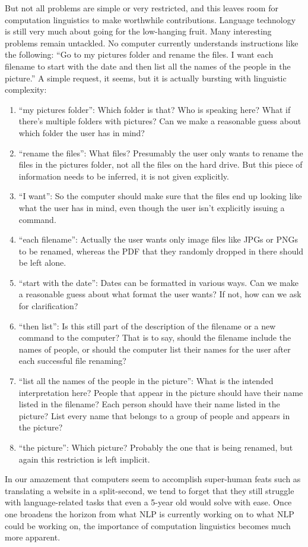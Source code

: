 But not all problems are simple or very restricted, and this leaves room for computation linguistics to make worthwhile contributions.
Language technology is still very much about going for the low-hanging fruit.
Many interesting problems remain untackled.
No computer currently understands instructions like the following: ``Go to my pictures folder and rename the files. I want each filename to start with the date and then list all the names of the people in the picture.''
A simple request, it seems, but it is actually bursting with linguistic complexity:
%
\begin{enumerate}
    \item ``my pictures folder'':
            Which folder is that?
            Who is speaking here?
            What if there's multiple folders with pictures?
            Can we make a reasonable guess about which folder the user has in mind?
    \item ``rename the files'':
            What files?
            Presumably the user only wants to rename the files in the pictures folder, not all the files on the hard drive.
            But this piece of information needs to be inferred, it is not given explicitly.
    \item ``I want'':
            So the computer should make sure that the files end up looking like what the user has in mind, even though the user isn't explicitly issuing a command.
    \item ``each filename'':
            Actually the user wants only image files like JPGs or PNGs to be renamed, whereas the PDF that they randomly dropped in there should be left alone.
    \item ``start with the date'':
            Dates can be formatted in various ways.
            Can we make a reasonable guess about what format the user wants?
            If not, how can we ask for clarification?
    \item ``then list'':
            Is this still part of the description of the filename or a new command to the computer?
            That is to say, should the filename include the names of people, or should the computer list their names for the user after each successful file renaming?
    \item ``list all the names of the people in the picture'':
            What is the intended interpretation here?
            People that appear in the picture should have their name listed in the filename?
            Each person should have their name listed in the picture?
            List every name that belongs to a group of people and appears in the picture?
    \item ``the picture'':
            Which picture?
            Probably the one that is being renamed, but again this restriction is left implicit.
\end{enumerate}
%
In our amazement that computers seem to accomplish super-human feats such as translating a website in a split-second, we tend to forget that they still struggle with language-related tasks that even a 5-year old would solve with ease.
Once one broadens the horizon from what NLP is currently working on to what NLP could be working on, the importance of computation linguistics becomes much more apparent.

